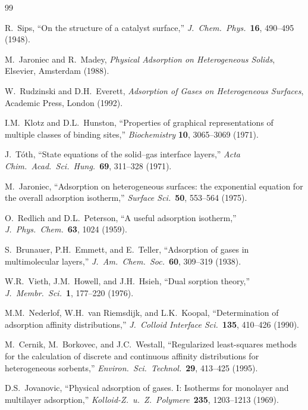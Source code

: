 \documentclass[12pt]{article}
\begin{document}
\begin{thebibliography}{99}

R.~Sips, ``On the structure of a catalyst surface,''
\textit{J.\ Chem.\ Phys.}\ \textbf{16}, 490--495 (1948).

M.~Jaroniec and R.~Madey,
\textit{Physical Adsorption on Heterogeneous Solids},
Elsevier, Amsterdam (1988).

W.~Rudzinski and D.H.~Everett,
\textit{Adsorption of Gases on Heterogeneous Surfaces},
Academic Press, London (1992).

I.M.~Klotz and D.L.~Hunston,
``Properties of graphical representations of multiple classes of
binding sites,''
\textit{Biochemistry} \textbf{10}, 3065--3069 (1971).

J.~T\'oth,
``State equations of the solid--gas interface layers,''
\textit{Acta Chim.\ Acad.\ Sci.\ Hung.}\ \textbf{69}, 311--328 (1971).

M.~Jaroniec,
``Adsorption on heterogeneous surfaces: the exponential equation
for the overall adsorption isotherm,''
\textit{Surface Sci.}\ \textbf{50}, 553--564 (1975).

O.~Redlich and D.L.~Peterson,
``A useful adsorption isotherm,''
\textit{J.\ Phys.\ Chem.}\ \textbf{63}, 1024 (1959).

S.~Brunauer, P.H.~Emmett, and E.~Teller,
``Adsorption of gases in multimolecular layers,''
\textit{J.\ Am.\ Chem.\ Soc.}\ \textbf{60}, 309--319 (1938).

W.R.~Vieth, J.M.~Howell, and J.H.~Hsieh,
``Dual sorption theory,''
\textit{J.\ Membr.\ Sci.}\ \textbf{1}, 177--220 (1976).

M.M.~Nederlof, W.H.~van Riemsdijk, and L.K.~Koopal,
``Determination of adsorption affinity distributions,''
\textit{J.\ Colloid Interface Sci.}\ \textbf{135}, 410--426 (1990).

M.~Cernik, M.~Borkovec, and J.C.~Westall,
``Regularized least-squares methods for the calculation of discrete
and continuous affinity distributions for heterogeneous sorbents,''
\textit{Environ.\ Sci.\ Technol.}\ \textbf{29}, 413--425 (1995).

D.S.~Jovanovic,
``Physical adsorption of gases. I: Isotherms for monolayer and
multilayer adsorption,''
\textit{Kolloid-Z.\ u.\ Z.\ Polymere}\ \textbf{235}, 1203--1213 (1969).


\end{thebibliography}
\end{document}
